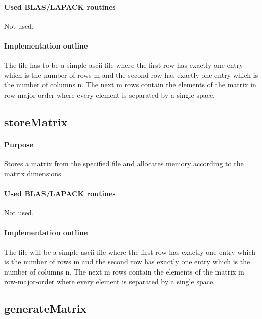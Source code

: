 \documentclass[a4paper,10pt]{scrartcl}
\begin{document}
			\paragraph{Used BLAS/LAPACK routines}

			Not used.

			\paragraph{Implementation outline}

			The file has to be a simple ascii file where the first row has exactly one entry which is the 
			number of rows m and the second row has exactly one entry which is the number of columns n.
 			The next m rows contain the elements of the matrix in row-major-order where every element is 
			separated by a single space.



		\subsection{storeMatrix}

			\paragraph{Purpose}

			Stores a matrix from the specified file and allocates memory according to the matrix 
			dimensions.

			\paragraph{Used BLAS/LAPACK routines}

			Not used.

			\paragraph{Implementation outline}

			The file will be a simple ascii file where the first row has exactly one entry which is the 
			number of rows m and the second row has exactly one entry which is the number of columns n.
 			The next m rows contain the elements of the matrix in row-major-order where every element is 
			separated by a single space.


		\subsection{generateMatrix}
\end{document}
